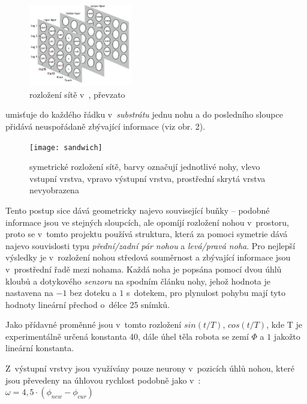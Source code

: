 \documentclass[a4]{article}
\begin{document}
\begin{figure}
  \begin{center}
    \includegraphics[width=0.4\textwidth]{clunenet}
  \end{center}
  \caption{rozložení sítě v~\cite{clunegait}, převzato \cite{clunegait}}
\end{figure}

\cite{clunegait} umisťuje do každého řádku v~\emph{substrátu} jednu nohu a do posledního sloupce přidává neuspořádaně zbývající informace (viz obr. 2).\par
\begin{figure}
  \begin{center}
    \texttt{[image: sandwich]}
  \end{center}
  \caption{symetrické rozložení sítě, barvy označují jednotlivé nohy, vlevo vstupní vrstva, vpravo výstupní vrstva, prostřední skrytá vrstva nevyobrazena}
\end{figure}
Tento postup sice dává geometricky najevo související buňky -- podobné informace jsou ve stejných sloupcích, ale opomíjí rozložení nohou v~prostoru, proto se v~tomto projektu používá struktura, která za pomoci symetrie dává najevo souvislosti typu \emph{přední/zadní pár nohou} a \emph{levá/pravá noha}. Pro nejlepší výsledky je v~rozložení nohou středová souměrnost a zbývající informace jsou v~prostřední řadě mezi nohama. Každá noha je popsána pomocí dvou úhlů kloubů a dotykového \emph{senzoru} na spodním článku nohy, jehož hodnota je nastavena na $-1$ bez doteku a $1$ s~dotekem, pro plynulost pohybu mají tyto hodnoty lineární přechod o~délce 25 snímků.\par
Jako přídavné proměnné jsou v~tomto rozložení $sin(t/T)$, $cos(t/T)$, kde T je experimentálně určená konstanta 40, dále úhel těla robota se zemí $\Phi$ a $1$ jakožto lineární konstanta.\par
Z~výstupní vrstvy jsou využívány pouze neurony v~pozicích úhlů nohou, které jsou převedeny na úhlovou rychlost podobně jako v~\cite{clunegait}:\\
$\omega = 4,5\cdot(\phi_{new} - \phi_{cur})$
\end{document}
